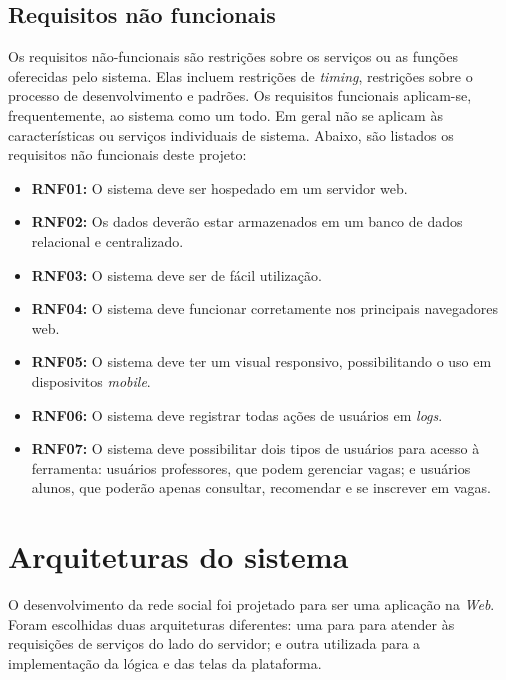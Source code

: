 \subsection{Requisitos não funcionais}
\label{requisitosRNF}
Os requisitos não-funcionais são restrições sobre os serviços ou as funções oferecidas pelo sistema. Elas incluem restrições de \textit{timing}, restrições sobre o processo de desenvolvimento e padrões. Os requisitos funcionais aplicam-se, frequentemente, ao sistema como um todo. Em geral não se aplicam às características ou serviços individuais de sistema. Abaixo, são listados os requisitos não funcionais deste projeto:  

\begin{itemize}
    \item \textbf{RNF01:} O sistema deve ser hospedado em um servidor web.

    \item \textbf{RNF02:} Os dados deverão estar armazenados em um banco de dados relacional e centralizado.  

    \item \textbf{RNF03:} O sistema deve ser de fácil utilização.  

    \item \textbf{RNF04:} O sistema deve funcionar corretamente nos principais navegadores web.

    \item \textbf{RNF05:} O sistema deve ter um visual responsivo, possibilitando o uso em disposivitos \textit{mobile}.
    
    \item \textbf{RNF06:} O sistema deve registrar todas ações de usuários em \textit{logs}.

    \item \textbf{RNF07:} O sistema deve possibilitar dois tipos de usuários para acesso à ferramenta: usuários professores, que podem gerenciar vagas; e usuários alunos, que poderão apenas consultar, recomendar e se inscrever em vagas.
\end{itemize}

\section{Arquiteturas do sistema}
\label{arquiteturaSistema}
O desenvolvimento da rede social foi projetado para ser uma aplicação na \textit{Web}. Foram escolhidas duas arquiteturas diferentes: uma para para atender às requisições de serviços do lado do servidor; e outra utilizada para a implementação da lógica e das telas da plataforma.

